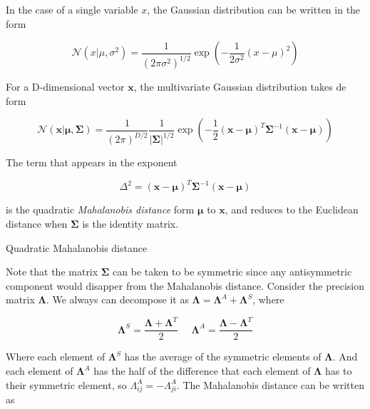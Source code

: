 
In the case of a single variable $x$, the Gaussian distribution can be written in the form

\begin{equation}\label{eq:gaussian}
 \mathcal{N}(x|\mu,\sigma^2) = \frac{1}{(2\pi \sigma^2)^{1/2}} \exp\left(- \frac{1}{2\sigma^2} (x-\mu)^2 \right)
\end{equation}

For a D-dimensional vector $\mathbf{x}$, the multivariate Gaussian distribution takes de form

\begin{equation}
 \mathcal{N}(\mathbf{x}|\bm{\mu},\mathbf{\Sigma}) =
 \frac{1}{(2\pi)^{D/2}} \frac{1}{|\mathbf{\Sigma}|^{1/2}} \exp \left(- \frac{1}{2} (\mathbf{x} - \bm{\mu})^T \mathbf{\Sigma}^{-1} (\mathbf{x} - \bm{\mu}) \right)
\end{equation}

The term that appears in the exponent 

\begin{equation}\label{eq:mahalanobisDistance2}
 \Delta^2 = (\mathbf{x} - \bm{\mu})^T \mathbf{\Sigma}^{-1} (\mathbf{x} - \bm{\mu})
\end{equation}

is the quadratic \emph{Mahalanobis distance} form $\bm{\mu}$ to $\mathbf{x}$, and reduces to the Euclidean distance when $\bm{\Sigma}$ is the identity matrix.

\begin{algorithm}  
  \caption{Quadratic Mahalanobis distance}
  \label{alg:mahalanobisDistance2}
  
\end{algorithm}

Note that the matrix $\bm{\Sigma}$ can be taken to be symmetric since any antisymmetric component would disapper from the Mahalanobis distance.
Consider the precision matrix $\bm{\Lambda}$.
We always can decompose it as $\bm{\Lambda} = \bm{\Lambda}^A + \bm{\Lambda}^S$, where

\begin{equation}
 \bm{\Lambda}^S = \frac{\bm{\Lambda} + \bm{\Lambda}^T}{2}  \ \ \ \ \ \ \bm{\Lambda}^A = \frac{\bm{\Lambda} - \bm{\Lambda}^T}{2}
\end{equation}

Where each element of $\bm{\Lambda}^S$ has the average of the symmetric elements of $\bm{\Lambda}$.
And each element of $\bm{\Lambda}^A$ has the half of the difference that each element of $\bm{\Lambda}$ has to their symmetric element, so $\Lambda_{ij}^A = -\Lambda_{ji}^A  $.
The Mahalanobis distance can be written as


